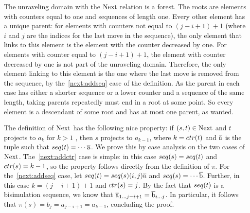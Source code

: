 The unraveling domain with the $\mathrm{Next}$ relation is a forest.
The roots are elements with counters equal to one and sequences of length one.
Every other element has a unique parent: for elements with counters not equal to $(j - i + 1) + 1$ (where $i$ and $j$ are the indices for the last move in the sequence), the only element that links to this element is the element with the counter decreased by one.
For elements with counter equal to $(j - i + 1) + 1$, the element with counter decreased by one is not part of the unraveling domain.
Therefore, the only element linking to this element is the one where the last move is removed from the sequence, by the~\ref{next:addseq} case of the definition.
As the parent in each case has either a shorter sequence or a lower counter and a sequence of the same length, taking parents repeatedly must end in a root at some point.
So every element is a descendant of some root and has at most one parent, as wanted.

The definition of $\mathrm{Next}$ has the following nice property: if $(s,t) \in \mathrm{Next}$ and $t$ projects to $a_{k}$ for $k > 1$ , then $s$ projects to $a_{k-1}$, where $k = \ctr{t}$ and $\overline{\mathrm{a}}$ is the tuple such that $\seq{t} = \cdots \elemtuplea$. 
We prove this by case analysis on the two cases of $\mathrm{Next}$.
The~\ref{next:addctr} case is simple: in this case $\seq{s} = \seq{t}$ and $\ctr{s} = k - 1$, so the property follows directly from the definition of $\pi$.
For the~\ref{next:addseq} case, let $\seq{t} = \seq{s} (i,j) \elemtuplea$ and $\seq{s} = \cdots \elemtupleb$.
Further, in this case $k = (j - i + 1) + 1$ and $\ctr{s} = j$.
By the fact that $\seq{t}$ is a bisimulation sequence, we know that $\overline{\mathrm{a}}_{1\ldots j-i+1} = \overline{\mathrm{b}}_{i\ldots j}$.
In particular, it follows that $\pi(s) = b_{j} = a_{j-i+1} = a_{k-1}$, concluding the proof.


